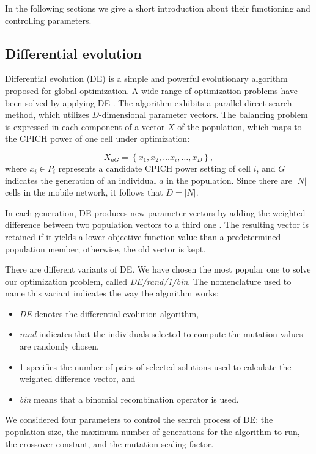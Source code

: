 In the following sections we give a short introduction about their
functioning and controlling parameters.


\subsection{Differential evolution}

Differential evolution (DE) \cite{storn1997_Differential_evolution}
is a simple and powerful evolutionary algorithm proposed for global
optimization. A wide range of optimization problems have been solved
by applying DE \cite{das2010_differential_evolution_state_of_the_art}.
The algorithm exhibits a parallel direct search method, which utilizes
$D$-dimensional parameter vectors. The balancing problem is expressed
in each component of a vector $X$ of the population, which maps to
the CPICH power of one cell under optimization:

\begin{equation}
X_{aG}=\left\{ x_{1},x_{2},\ldots x_{i},\ldots,x_{D}\right\} ,\label{eq:DE_mapping}
\end{equation}
where $x_{i}\in P_{i}$ represents a candidate CPICH power setting
of cell $i$, and $G$ indicates the generation of an individual $a$
in the population. Since there are $|N|$ cells in the mobile network,
it follows that $D=|N|$.

In each generation, DE produces new parameter vectors by adding the
weighted difference between two population vectors to a third one
\cite{storn1997_Differential_evolution}. The resulting vector is
retained if it yields a lower objective function value than a predetermined
population member; otherwise, the old vector is kept.

There are different variants of DE. We have chosen the most popular
one to solve our optimization problem, called \emph{DE/rand/1/bin}.
The nomenclature used to name this variant indicates the way the algorithm
works:
\begin{itemize}
\item \emph{DE }denotes the differential evolution algorithm,
\item \emph{rand }indicates that the individuals selected to compute the
mutation values are randomly chosen,
\item 1\emph{ }specifies the number of pairs of selected solutions used
to calculate the weighted difference vector, and
\item \emph{bin }means that a binomial recombination operator is used.
\end{itemize}
We considered four parameters to control the search process of DE:
the population size, the maximum number of generations for the algorithm
to run, the crossover constant, and the mutation scaling factor.


